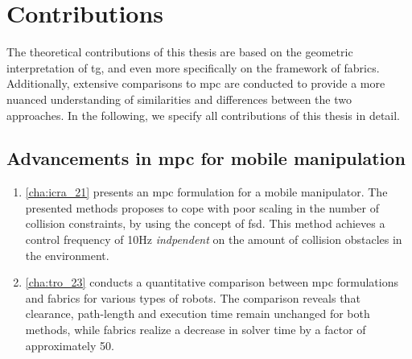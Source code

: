 \section{Contributions}
\label{sec:contributions}

The theoretical contributions of this thesis
are based on the geometric interpretation of \ac{tg}, and
even more specifically on the framework of \ac{fabrics}.
Additionally, extensive
comparisons to \ac{mpc} are conducted to
provide a more nuanced understanding of similarities and
differences between the two approaches. In the following, we
specify all contributions of this thesis in detail.


\subsection{Advancements in \ac{mpc} for mobile manipulation}
\begin{enumerate}
    \item \cref{cha:icra_21} presents an \ac{mpc} formulation for a
      mobile manipulator. The presented methods proposes to cope
      with poor scaling in the number of collision constraints, by
      using the concept of \ac{fsd}. This method achieves a
      control frequency of 10Hz \textit{indpendent} on the amount
      of collision obstacles in the environment.
    \item \cref{cha:tro_23} conducts a quantitative comparison between \ac{mpc}
      formulations and \ac{fabrics} for various types of
      robots. The comparison reveals that clearance,
      path-length and execution time remain unchanged for
      both methods, while \ac{fabrics} realize a decrease in
      solver time by a factor of approximately 50.
\end{enumerate}

